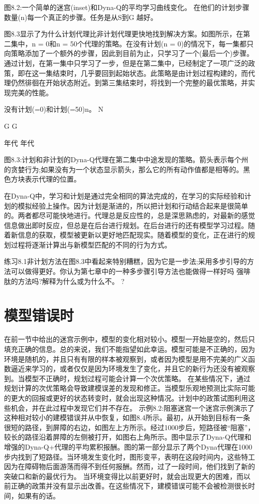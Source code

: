 图8.2:一个简单的迷宫(inset)和Dyna-Q的平均学习曲线变化。
在他们的计划步骤数量(n)每一个真正的步骤。任务是从S到G
越好。



图8.3显示了为什么计划代理比非计划代理更快地找到解决方案。如图所示，在第二集中，n = 0和n = 50个代理的策略。在没有计划(n = 0)的情况下，每一集都只向策略添加了一个额外的步骤，因此到目前为止，只学习了一个(最后一个)步骤。通过计划，在第一集中只学习了一步，但是在第二集中，已经制定了一项广泛的政策，即在这一集结束时，几乎要回到起始状态。此策略是由计划过程构建的，而代理仍然徘徊在开始状态附近。到第三集结束时，将找到一个完整的最优策略，并实现完美的性能。

没有计划(=0)和计划(=50)n。 					N

								G										G
																		
																		
年代										年代								

图8.3:计划和非计划的Dyna-Q代理在第二集中中途发现的策略。箭头表示每个州的贪婪行为;如果没有为一个状态显示箭头，那么它的所有动作值都是相等的。黑色方块表示代理的位置。

在Dyna-Q中，学习和计划是通过完全相同的算法完成的，在学习的实际经验和计划的模拟经验上操作。因为计划是渐进的，所以把计划和行动结合起来是很简单的。两者都尽可能快地进行。代理总是反应性的，总是深思熟虑的，对最新的感觉信息做出即时反应，但总是在后台进行规划。在后台进行的还有模型学习过程。随着新信息的获取，模型被更新以更好地匹配现实。随着模型的变化，正在进行的规划过程将逐渐计算出与新模型匹配的不同的行为方式。

练习8.1非计划方法在图8.3中看起来特别糟糕，因为它是一步法;采用多步引导的方法可以做得更好。你认为第七章中的一种多步骤引导方法也能做得一样好吗
强啡肽的方法吗?解释为什么或为什么不。 					?


\section{模型错误时}

在前一节中给出的迷宫示例中，模型的变化相对较小。模型一开始是空的，然后只填充正确的信息。总的来说，我们不能指望如此幸运。模型可能是不正确的，因为环境是随机的，并且只有有限的样本被观察到，或者因为模型是用不完美的广义函数逼近来学习的，或者仅仅是因为环境发生了变化，并且它的新行为还没有被观察到。当模型不正确时，规划过程可能会计算一个次优策略。
在某些情况下，通过规划计算的次优策略会导致建模误差的发现和修正。当模型乐观地预测比实际可能的更大的回报或更好的状态转变时，就会出现这种情况。计划中的政策试图利用这些机会，并在此过程中发现它们并不存在。
示例8.2:阻塞迷宫一个迷宫示例演示了这种相对较小的建模错误并从中恢复，如图8.4所示。最初，从开始到目标有一条很短的路径，到屏障的右边，如图左上方所示。经过1000步后，短路径被“阻塞”，较长的路径沿着屏障的左侧被打开，如图右上角所示。图中显示了Dyna-Q代理和增强的Dyna-Q+代理的平均累积报酬。图的第一部分显示了两个Dyna代理在1000步内找到了短路径。当环境发生变化时，图形变平，表明在这段时间内，这些特工因为在障碍物后面游荡而得不到任何报酬。然而，过了一段时间，他们找到了新的突破口和新的最优行为。
当环境变得比以前更好时，就会出现更大的困难，而以前正确的政策并没有显示出改善。在这些情况下，建模错误可能不会被检测很长时间，如果有的话。
	
